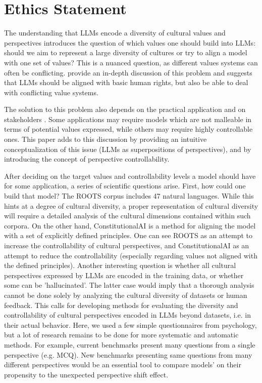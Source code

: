 \section*{Ethics Statement} The understanding that LLMs encode a diversity of cultural values and perspectives introduces the question of which values one should build into LLMs: should we aim to represent a large diversity of cultures or try to align a model with one set of values? This is a nuanced question, as different values systems can often be conflicting. \cite{johnson2022ghost} provide an in-depth discussion of this problem and suggests that LLMs should be aligned with basic human rights, but also be able to deal with conflicting value systems.

The solution to this problem also depends on the practical application and on stakeholders \citep{bender2021dangers,jernite2022data}. Some applications may require models which are not malleable in terms of potential values expressed, while others may require highly controllable ones. This paper adds to this discussion by providing an intuitive conceptualization of this issue (LLMs as superpositions of perspectives), and by introducing the concept of perspective controllability. 

After deciding on the target values and controllability levels a model should have for some application, a series of scientific questions arise. First, how could one build that model? The ROOTS corpus \citep{laurenccon2022bigscience} includes 47 natural languages. While this hints at a degree of cultural diversity, a proper representation of cultural diversity will require a detailed analysis of the cultural dimensions contained within such corpora. On the other hand, ConstitutionalAI \citep{bai2022constitutional} is a method for aligning the model with a set of explicitly defined principles. One can see ROOTS as an attempt to increase the controllability of cultural perspectives, and ConstitutionalAI as an attempt to reduce the controllability (especially regarding values not aligned with the defined principles). Another interesting question is whether all cultural perspectives expressed by LLMs are encoded in the training data, or whether some can be 'hallucinated'. The latter case would imply that a thorough analysis cannot be done solely by analyzing the cultural diversity of datasets or human feedback. This calls for developing methods for evaluating the diversity and controllability of cultural perspectives encoded in LLMs beyond datasets, i.e. in their actual behavior. Here, we used a few simple questionnaires from psychology, but a lot of research remains to be done for more systematic and automatic methods. For example, current benchmarks present many questions from a single perspective (e.g. MCQ). New benchmarks presenting same questions from many different perspectives would be an essential tool to compare models' on their propensity to the unexpected perspective shift effect.


